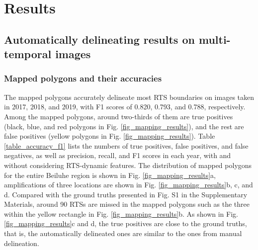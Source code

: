 \documentclass[authoryear,preprint,review,12pt]{elsarticle}
\begin{document}
\section{Results}
\label{sec_result}


\subsection{Automatically delineating results on multi-temporal images}
\label{sec_result_auto_deliea}


\subsubsection{Mapped polygons and their accuracies} %
\label{sec_mapped_polygons}

The mapped polygons accurately delineate most RTS boundaries on images taken in 2017, 2018, and 2019, with F1 scores of 0.820, 0.793, and 0.788, respectively.
Among the mapped polygons, around two-thirds of them are true positives (black, blue, and red polygons in Fig. \ref{fig_mapping_results}), and the rest are false positives (yellow polygons in Fig. \ref{fig_mapping_results}). 
Table \ref{table_accuracy_f1} lists the numbers of true positives, false positives, and false negatives, as well as precision, recall, and F1 scores in each year, with and without considering RTS-dynamic features.
The distribution of mapped polygons for the entire Beiluhe region is shown in Fig. \ref{fig_mapping_results}a, amplifications of three locations are shown in Fig. \ref{fig_mapping_results}b, c, and d. 
Compared with the ground truths presented in Fig. S1 in the Supplementary Materials,  around 90 RTSs are missed in the mapped polygons such as the three within the yellow rectangle in Fig. \ref{fig_mapping_results}b.
As shown in Fig. \ref{fig_mapping_results}c and d, the true positives are close to the ground truths, that is, the automatically delineated ones are similar to the ones from manual delineation. 
\end{document}
